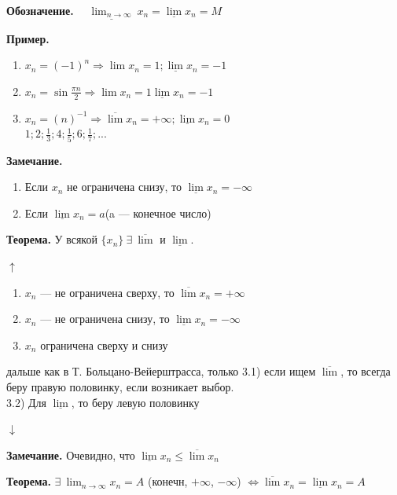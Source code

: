 \documentclass{article}
\begin{document}
    \textbf{Обозначение.} \(\quad \underline{\lim_{n \rightarrow \infty}}\ x_n = \underline{\lim} x_n = M \)

    \textbf{Пример.}
    \begin{enumerate}
        \item \(x_n = (-1)^n \Rightarrow \lim{x_n} = 1; \underline{\lim}x_n=-1\)
        
        \item \(x_n = \sin{\frac{\pi n}{2}} \Rightarrow \lim{x_n} = 1 \underline{\lim}x_n=-1\)
    
        \item \(x_n = (n)^{-1} \Rightarrow \overline{\lim}x_n = +\infty;\underline{\lim}x_n=0\)\\
        \( 1; 2; \frac{1}{3}; 4; \frac{1}{5}; 6; \frac{1}{7}; ... \)
    \end{enumerate}
    
    \textbf{Замечание.} 
    \begin{enumerate}
        \item Если \(x_n\) не ограничена снизу, то \(\underline{\lim}x_n = -\infty\)
        
        \item Если \(\underline{\lim}x_n = a\)(a --- конечное число)
    \end{enumerate}
    
    \textbf{Теорема.} У всякой \(\{x_n\}\ \exists\ \overline{\lim}\) и \(\underline{\lim}\).

    \(\uparrow\)
    \begin{enumerate}
        \item \(x_n\) --- не ограничена сверху, то \(\overline{\lim}x_n = +\infty\)
        \item \(x_n\) --- не ограничена снизу, то \(\underline{\lim}x_n = -\infty\)
        \item \(x_n\) ограничена сверху и снизу
    \end{enumerate}

    дальше как в Т. Больцано-Вейерштрасса, только 3.1) если ищем \( \overline{\lim} \), то всегда беру правую половинку, если возникает выбор.
    \\3.2) Для \(\underline{\lim}\), то беру левую половинку

    \( \downarrow \)

    \textbf{Замечание.} Очевидно, что \( \underline{\lim}x_n \leq \overline{\lim}x_n \)

    \textbf{Теорема.} \( \exists\ \lim_{n \rightarrow \infty} x_n = A \) (конечн, \(+\infty\), \(-\infty\)) \( \Leftrightarrow \overline{\lim}x_n = \underline{\lim}x_n = A \)
\end{document}
